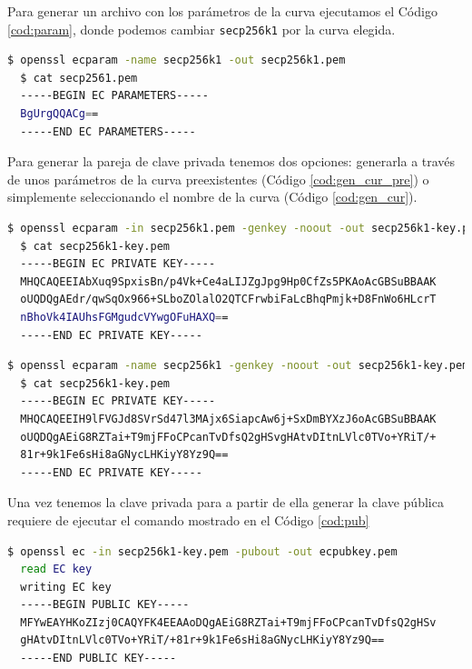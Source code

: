 \documentclass[11pt]{article}
\begin{document}
Para generar un archivo con los parámetros de la curva ejecutamos el Código \ref{cod:param}, donde podemos cambiar \texttt{secp256k1} por la curva elegida.

\begin{lstlisting}[language=bash, label={cod:EC}, caption={Generar los parámetros de la curva}, morekeywords={name, out}]
  $ openssl ecparam -name secp256k1 -out secp256k1.pem
  $ cat secp2561.pem
  -----BEGIN EC PARAMETERS-----
  BgUrgQQACg==
  -----END EC PARAMETERS-----
\end{lstlisting}

Para generar la pareja de clave privada tenemos dos opciones: generarla a través de unos parámetros de la curva preexistentes (Código \ref{cod:gen_cur_pre}) o simplemente seleccionando el nombre de la curva (Código \ref{cod:gen_cur}).

\begin{lstlisting}[language=bash, label={cod:gen_cur_pre}, caption={Crear clave privada, parámetros de curva preexistentes}, morekeywords={out, pubout, genkey}]
  $ openssl ecparam -in secp256k1.pem -genkey -noout -out secp256k1-key.pem
  $ cat secp256k1-key.pem 
  -----BEGIN EC PRIVATE KEY-----
  MHQCAQEEIAbXuq9SpxisBn/p4Vk+Ce4aLIJZgJpg9Hp0CfZs5PKAoAcGBSuBBAAK
  oUQDQgAEdr/qwSqOx966+SLboZOlalO2QTCFrwbiFaLcBhqPmjk+D8FnWo6HLcrT
  nBhoVk4IAUhsFGMgudcVYwgOFuHAXQ==
  -----END EC PRIVATE KEY-----
\end{lstlisting}

\begin{lstlisting}[language=bash, label={cod:gen_cur}, caption={Crear clave privada a partir del nombre de la curva}, morekeywords={out, genkey, noout, name}]
  $ openssl ecparam -name secp256k1 -genkey -noout -out secp256k1-key.pem
  $ cat secp256k1-key.pem
  -----BEGIN EC PRIVATE KEY-----
  MHQCAQEEIH9lFVGJd8SVrSd47l3MAjx6SiapcAw6j+SxDmBYXzJ6oAcGBSuBBAAK
  oUQDQgAEiG8RZTai+T9mjFFoCPcanTvDfsQ2gHSvgHAtvDItnLVlc0TVo+YRiT/+
  81r+9k1Fe6sHi8aGNycLHKiyY8Yz9Q==
  -----END EC PRIVATE KEY-----
\end{lstlisting}

Una vez tenemos la clave privada para a partir de ella generar la clave pública requiere de ejecutar el comando mostrado en el Código \ref{cod:pub}

\begin{lstlisting}[language=bash, label={cod:pub}, caption={Crear la clave pública a partir de la privada}, morekeywords={out, pubout}]
  $ openssl ec -in secp256k1-key.pem -pubout -out ecpubkey.pem
  read EC key
  writing EC key
  -----BEGIN PUBLIC KEY-----
  MFYwEAYHKoZIzj0CAQYFK4EEAAoDQgAEiG8RZTai+T9mjFFoCPcanTvDfsQ2gHSv
  gHAtvDItnLVlc0TVo+YRiT/+81r+9k1Fe6sHi8aGNycLHKiyY8Yz9Q==
  -----END PUBLIC KEY-----
\end{lstlisting}

\newpage
\nocite{*}
\end{document}
